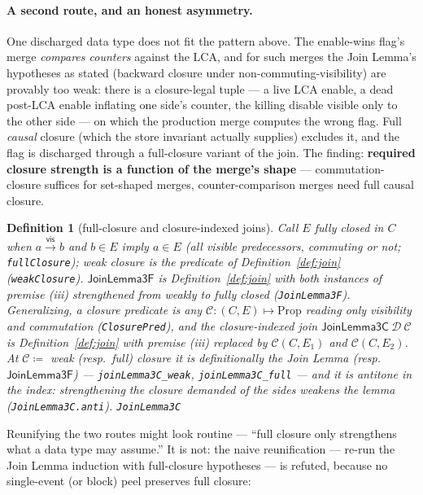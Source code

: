 \documentclass[11pt]{article}
\newtheorem{definition}[theorem]{Definition}
\newcommand{\vis}{\xrightarrow{\mathsf{vis}}}
\newcommand{\lean}[1]{\texttt{#1}}
\newcommand{\M}[1]{\mathcal{#1}}
\begin{document}
\paragraph{A second route, and an honest asymmetry.} One discharged data
type does not fit the pattern above. The enable-wins flag's merge
\emph{compares counters} against the LCA, and for such merges the Join
Lemma's hypotheses as stated (backward closure under
non-commuting-visibility) are provably too weak: there is a
closure-legal tuple --- a live LCA enable, a dead post-LCA enable
inflating one side's counter, the killing disable visible only to the
other side --- on which the production merge computes the wrong flag. Full
\emph{causal} closure (which the store invariant actually supplies)
excludes it, and the flag is discharged through a full-closure variant of
the join. The finding: \textbf{required closure strength is a function of
the merge's shape} --- commutation-closure suffices for set-shaped merges,
counter-comparison merges need full causal closure.

\begin{definition}[full-closure and closure-indexed joins]
\label{def:joinc}
Call $E$ \emph{fully closed} in $C$ when $a \vis b$ and $b \in E$
imply $a \in E$ (all visible predecessors, commuting or not;
\lean{fullClosure}); weak closure is the predicate of
Definition~\ref{def:join} (\lean{weakClosure}). $\mathsf{JoinLemma3F}$
is Definition~\ref{def:join} with both instances of premise (iii)
strengthened from weakly to fully closed (\lean{JoinLemma3F}).
Generalizing, a \emph{closure predicate} is any
$\mathcal{C} : (C, E) \mapsto \mathrm{Prop}$ reading only visibility
and commutation (\lean{ClosurePred}), and the \emph{closure-indexed
join} $\mathsf{JoinLemma3C}\ \M{D}\ \mathcal{C}$ is
Definition~\ref{def:join} with premise (iii) replaced by
$\mathcal{C}(C, E_1)$ and $\mathcal{C}(C, E_2)$. At
$\mathcal{C} \coloneqq$ weak (resp.\ full) closure it is
\emph{definitionally} the Join Lemma (resp.\ $\mathsf{JoinLemma3F}$)
--- \lean{joinLemma3C\_weak}, \lean{joinLemma3C\_full} --- and it is
antitone in the index: strengthening the closure demanded of the sides
weakens the lemma (\lean{JoinLemma3C.anti}).
\hfill\lean{JoinLemma3C}
\end{definition}

Reunifying the two routes might look routine --- ``full closure
only strengthens what a data type may assume.'' It is not: the naive reunification --- re-run the Join Lemma induction
with full-closure hypotheses --- is refuted, because no single-event
(or block) peel preserves full closure:
\end{document}
